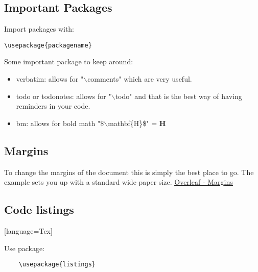 





\subsection{Important Packages}
\par Import packages with:
\begin{lstlisting}[language=Tex]
    \usepackage{packagename}
\end{lstlisting}

\par Some important package to keep around:
\begin{itemize}
    \item verbatim: allows for "$\backslash$comments" which are very useful.
    \item todo or todonotes: allows for "$\backslash$todo" and that is the best way of having reminders in your code.
    \item bm: allows for bold math "\$$\backslash$mathbf\{H\}\$" = $\mathbf{H}$
\end{itemize}


\subsection{Margins}
To change the margins of the document this is simply the best place to go. 
The example sets you up with a standard wide paper size.
\href{https://www.overleaf.com/learn/latex/Page_size_and_margins#Paper_size.2C_orientation_and_margins}{\ul{Overleaf - Margins}}








\subsection{Code listings}[language=Tex]
\par Use package:
\begin{lstlisting}
    \usepackage{listings}
\end{lstlisting}


